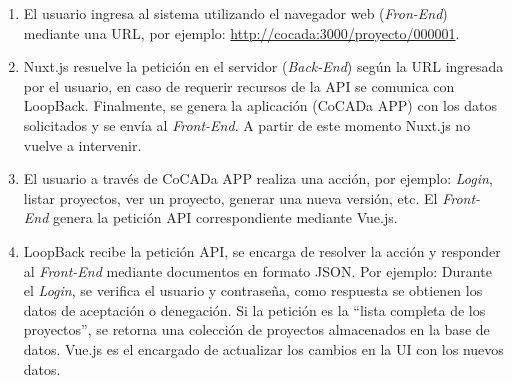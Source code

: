 \begin{enumerate}
    \item El usuario ingresa al sistema utilizando el navegador web (\textit{Fron-End}) mediante una URL, por ejemplo:  \url{http://cocada:3000/proyecto/000001}.
    
    \item Nuxt.js resuelve la petición en el servidor (\textit{Back-End}) según la \Gls{URL} ingresada por el usuario, 
    en caso de requerir recursos de la API se comunica con LoopBack. Finalmente, se genera la aplicación (CoCADa APP) con los datos solicitados y se envía al \textit{Front-End}. A partir de este momento Nuxt.js no vuelve a intervenir.  

   \item El usuario a través de CoCADa APP realiza una acción, por ejemplo: \textit{Login}, listar proyectos, ver un proyecto, generar una nueva versión, etc. El \textit{Front-End} genera la petición API correspondiente mediante Vue.js. %
   
   \item LoopBack recibe la petición API, se encarga de resolver la acción y responder al \textit{Front-End} mediante documentos en formato JSON. 
   Por ejemplo: Durante el \textit{Login}, se verifica el usuario y contraseña, como respuesta se obtienen los datos de aceptación o denegación. Si la petición es la ``lista completa de los proyectos'', se retorna una colección de proyectos almacenados en la base de datos. Vue.js es el encargado de actualizar los cambios en la UI con los nuevos datos.

\end{enumerate}

